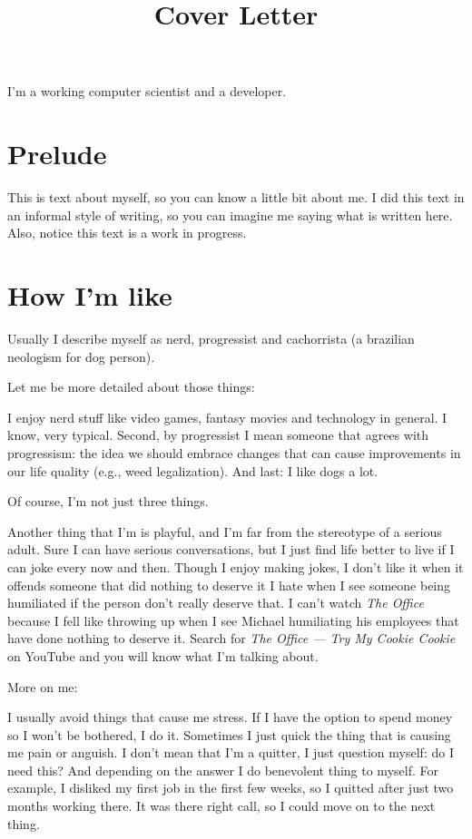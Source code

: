 \documentclass[11pt,a4paper,sans]{moderncv}
\title{Cover Letter}
\begin{document}
\makecvtitle %
I'm a working computer scientist and a developer.

\section{Prelude}
This is text about myself, so you can know a little bit about me.
I did this text in an informal style of writing, so you can imagine me saying what is written here.
Also, notice this text is a work in progress.

\section{How I'm like}
Usually I describe myself as nerd, progressist and cachorrista (a brazilian neologism for dog person).

Let me be more detailed about those things:

I enjoy nerd stuff like video games, fantasy movies and technology in general.
I know, very typical.
Second, by progressist I mean someone that agrees with progressism: the idea we should embrace changes that can cause improvements in our life quality (e.g., weed legalization).
And last: I like dogs a lot.

\medskip

Of course, I'm not just three things.

\medskip

Another thing that I'm is playful, and I'm far from the stereotype of a serious adult.
Sure I can have serious conversations, but I just find life better to live if I can joke every now and then.
Though I enjoy making jokes, I don't like it when it offends someone that did nothing to deserve it
I hate when I see someone being humiliated if the person don't really deserve that.
I can't watch \textit{The Office} because I fell like throwing up when I see Michael humiliating his employees that have done nothing to deserve it.
Search for \textit{The Office — Try My Cookie Cookie} on YouTube and you will know what I'm talking about.

\medskip

More on me:

\medskip

I usually avoid things that cause me stress.
If I have the option to spend money so I won't be bothered, I do it.
Sometimes I just quick the thing that is causing me pain or anguish.
I don't mean that I'm a quitter, I just question myself: do I need this?
And depending on the answer I do benevolent thing to myself.
For example, I disliked my first job in the first few weeks, so I quitted after just two months working there.
It was there right call, so I could move on to the next thing.
\end{document}
